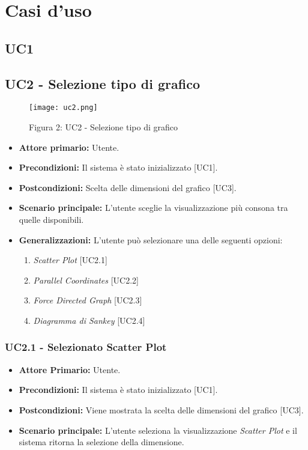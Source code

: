 \chapter{Casi d'uso}

\section{UC1}

\section{UC2 - Selezione tipo di grafico}
\begin{figure}[H]
 \texttt{[image: uc2.png]}
 \vspace{-5mm}
 \caption*{Figura 2: UC2 - Selezione tipo di grafico}
\end{figure}
 \begin{itemize}
     \item \textbf{Attore primario:} Utente.
     \item \textbf{Precondizioni:} Il sistema è stato inizializzato [UC1].
     \item \textbf{Postcondizioni:} Scelta delle dimensioni del grafico [UC3].
     \item \textbf{Scenario principale:} L'utente sceglie la visualizzazione più consona tra quelle disponibili.
     \item \textbf{Generalizzazioni:} L'utente può selezionare una delle seguenti opzioni:
     \begin{enumerate}
         \item \textit{Scatter Plot} [UC2.1]
         \item \textit{Parallel Coordinates} [UC2.2]
         \item \textit{Force Directed Graph} [UC2.3]
         \item \textit{Diagramma di Sankey} [UC2.4]
     \end{enumerate}
 \end{itemize}
 
 \subsection{UC2.1 - Selezionato Scatter Plot}
  \begin{itemize}
      \item \textbf{Attore Primario:} Utente.
      \item \textbf{Precondizioni:} Il sistema è stato inizializzato [UC1].
      \item \textbf{Postcondizioni:} Viene mostrata la scelta delle dimensioni del grafico [UC3].
      \item \textbf{Scenario principale:} L'utente seleziona la visualizzazione \textit{Scatter Plot} e il sistema ritorna la selezione della dimensione.
  \end{itemize}

